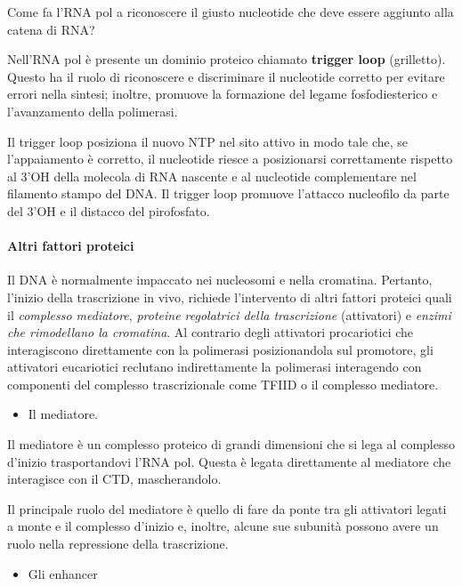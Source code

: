 \documentclass[]{article}
\begin{document}
Come fa l'RNA pol a riconoscere il giusto nucleotide che deve essere
aggiunto alla catena di RNA?

Nell'RNA pol è presente un dominio proteico chiamato \textbf{trigger
loop} (grilletto). Questo ha il ruolo di riconoscere e discriminare il
nucleotide corretto per evitare errori nella sintesi; inoltre, promuove
la formazione del legame fosfodiesterico e l'avanzamento della
polimerasi.

Il trigger loop posiziona il nuovo NTP nel sito attivo in modo tale che,
se l'appaiamento è corretto, il nucleotide riesce a posizionarsi
correttamente rispetto al 3'OH della molecola di RNA nascente e al
nucleotide complementare nel filamento stampo del DNA. Il trigger loop
promuove l'attacco nucleofilo da parte del 3'OH e il distacco del
pirofosfato.

\paragraph{Altri fattori proteici}\label{altri-fattori-proteici}

Il DNA è normalmente impaccato nei nucleosomi e nella cromatina.
Pertanto, l'inizio della trascrizione in vivo, richiede l'intervento di
altri fattori proteici quali il \emph{complesso mediatore},
\emph{proteine regolatrici della trascrizione} (attivatori) e
\emph{enzimi che rimodellano la cromatina}. Al contrario degli
attivatori procariotici che interagiscono direttamente con la polimerasi
posizionandola sul promotore, gli attivatori eucariotici reclutano
indirettamente la polimerasi interagendo con componenti del complesso
trascrizionale come TFIID o il complesso mediatore.

\begin{itemize}
\itemsep1pt\parskip0pt
\item
  Il mediatore.
\end{itemize}

Il mediatore è un complesso proteico di grandi dimensioni che si lega al
complesso d'inizio trasportandovi l'RNA pol. Questa è legata
direttamente al mediatore che interagisce con il CTD, mascherandolo.

Il principale ruolo del mediatore è quello di fare da ponte tra gli
attivatori legati a monte e il complesso d'inizio e, inoltre, alcune sue
subunità possono avere un ruolo nella repressione della trascrizione.

\begin{itemize}
\itemsep1pt\parskip0pt
\item
  Gli enhancer
\end{itemize}
\end{document}

